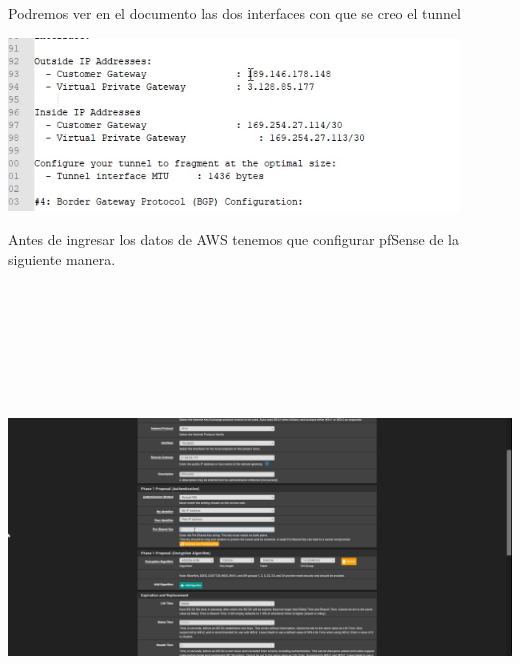 \documentclass{article} %
\begin{document}
\noindent 

\noindent Podremos ver en el documento las dos interfaces con que se creo el tunnel 

\noindent \includegraphics*[width=4.71in, height=1.81in]{image30}

\noindent 

\noindent 

\noindent 

\noindent Antes de ingresar los datos de AWS tenemos que configurar pfSense de la siguiente manera.

\noindent 

\noindent 

\noindent \includegraphics*[width=5.43in, height=5.29in, trim=2.74in 0.00in 2.88in 0.00in]{image31}

\noindent 

\noindent 
\end{document}
